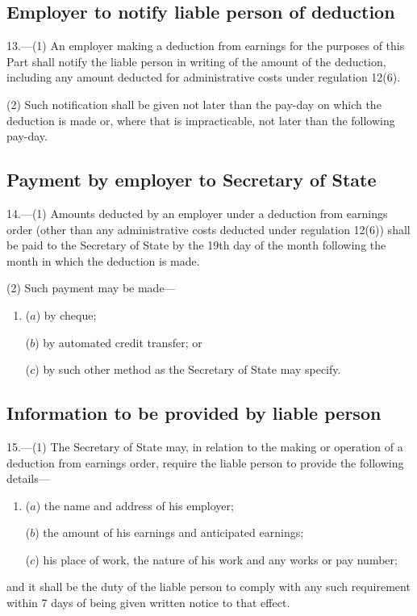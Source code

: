 \documentclass[a4paper]{article}
\begin{document}
\subsection[13. Employer to notify liable person of deduction]{Employer to notify liable person of deduction}

13.—(1) An employer making a deduction from earnings for the purposes of this Part shall notify the liable person in writing of the amount of the deduction, including any amount deducted for administrative costs under regulation 12(6).

(2) Such notification shall be given not later than the pay-day on which the deduction is made or, where that is impracticable, not later than the following pay-day.

\subsection[14. Payment by employer to Secretary of State]{Payment by employer to Secretary of State}

14.—(1) Amounts deducted by an employer under a deduction from earnings order (other than any administrative costs deducted under regulation 12(6)) shall be paid to the Secretary of State by the 19th day of the month following the month in which the deduction is made.

(2) Such payment may be made—
\begin{enumerate}\item[]
($a$) by cheque;

($b$) by automated credit transfer; or

($c$) by such other method as the Secretary of State may specify.
\end{enumerate}

\subsection[15. Information to be provided by liable person]{Information to be provided by liable person}

15.—(1) The Secretary of State may, in relation to the making or operation of a deduction from earnings order, require the liable person to provide the following details—
\begin{enumerate}\item[]
($a$) the name and address of his employer;

($b$) the amount of his earnings and anticipated earnings;

($c$) his place of work, the nature of his work and any works or pay number;
\end{enumerate}
and it shall be the duty of the liable person to comply with any such requirement within 7 days of being given written notice to that effect.
\end{document}
